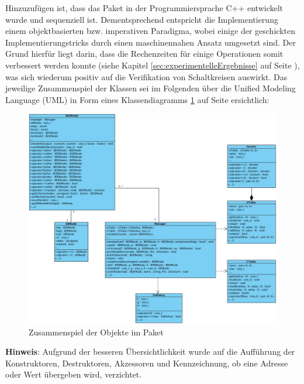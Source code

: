 \noindent 
Hinzuzufügen ist, dass das Paket in der Programmiersprache C++ entwickelt wurde und sequenziell ist. Dementsprechend entspricht die Implementierung einem objektbasierten bzw. imperativen Paradigma, wobei einige der geschickten Implementierungstricks durch einen maschinennahen Ansatz umgesetzt sind. Der Grund hierfür liegt darin, dass die Rechenzeiten für einige Operationen somit verbessert werden konnte (siehe Kapitel \ref{sec:experimentelleErgebnisse} auf Seite \pageref{sec:experimentelleErgebnisse}), was sich wiederum positiv auf die Verifikation von Schaltkreisen auswirkt. Das jeweilige Zusammenspiel der Klassen sei im Folgenden über die Unified Modeling Language (UML) \cite{ikrr2010} in Form eines Klassendiagramms \ref{fig:class} auf Seite \pageref{fig:class} ersichtlich:
\newpage
\begin{figure}[bth]
	\centering
	\includegraphics[scale=0.4]{./img/class}
	\caption[Zusammenspiel der Objekte im Paket]{Zusammenspiel der Objekte im Paket}
	\label{fig:class}
\end{figure}
\noindent
\textbf{Hinweis}: Aufgrund der besseren Übersichtlichkeit wurde auf die Aufführung der Konstruktoren, Destruktoren, Akzessoren und Kennzeichnung, ob eine Adresse oder Wert übergeben wird, verzichtet.\\\\
